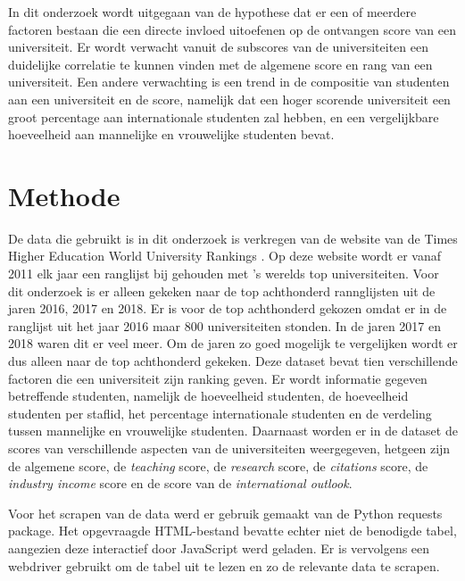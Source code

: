 \documentclass{uva-inf-article}
\begin{document}
In dit onderzoek wordt uitgegaan van de hypothese dat er een of meerdere factoren bestaan die een directe invloed uitoefenen op de ontvangen score van een universiteit. Er wordt verwacht vanuit de subscores van de universiteiten een duidelijke correlatie te kunnen vinden met de algemene score en rang van een universiteit. Een andere verwachting is een trend in de compositie van studenten aan een universiteit en de score, namelijk dat een hoger scorende universiteit een groot percentage aan internationale studenten zal hebben, en een vergelijkbare hoeveelheid aan mannelijke en vrouwelijke studenten bevat.


\section*{Methode}

De data die gebruikt is in dit onderzoek is verkregen van de website van de Times Higher Education World University Rankings \cite{Times}. Op deze website wordt er vanaf 2011 elk jaar  een ranglijst bij gehouden met 's werelds top universiteiten. Voor dit onderzoek is er alleen gekeken naar de top achthonderd rannglijsten uit de jaren 2016, 2017 en 2018. Er is voor de top achthonderd gekozen omdat er in de ranglijst uit het jaar 2016 maar 800 universiteiten stonden. In de jaren 2017 en 2018 waren dit er veel meer. Om de jaren zo goed mogelijk te vergelijken wordt er dus alleen naar de top achthonderd gekeken. Deze dataset bevat tien verschillende factoren die een universiteit zijn ranking geven. Er wordt informatie gegeven betreffende studenten, namelijk de hoeveelheid studenten, de hoeveelheid studenten per staflid, het percentage internationale studenten en de verdeling tussen mannelijke en vrouwelijke studenten. Daarnaast worden er in de dataset de scores van verschillende aspecten van de universiteiten weergegeven, hetgeen zijn de algemene score, de \textit{teaching} score, de \textit{research} score, de \textit{citations} score, de \textit{industry income} score en de score van de \textit{international outlook}.

Voor het scrapen van de data werd er gebruik gemaakt van de Python requests package. Het opgevraagde HTML-bestand bevatte echter niet de benodigde tabel, aangezien deze interactief door JavaScript werd geladen. Er is vervolgens een webdriver gebruikt om de tabel uit te lezen en zo de relevante data te scrapen. 
\end{document}
